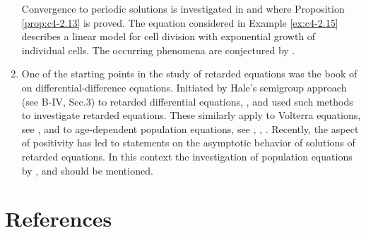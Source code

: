 \begin{enumerate}[label=\emph{Section \arabic*:}, wide, itemsep=1ex]
Convergence to periodic solutions is investigated in \citet{kerscherNagel:1984} and \citet{nagel:1984} where Proposition \ref{prop:c4-2.13} is proved.
The equation considered in Example \ref{ex:c4-2.15} describes a linear model for cell division with exponential growth of individual cells.
The occurring phenomena are conjectured by \citet{diekmannetal:1984}.

\item%
One of the starting points in the study of retarded equations was the book of \citet{bellmancooke:1963} on differential-difference equations.
Initiated by Hale's semigroup approach (see B-IV, Sec.3) to retarded differential equations, \citet{dysonvillella:1979}, \citet{villellabressan:1985} and \citet{webb:1977} used such methods to investigate retarded equations.
These similarly apply to Volterra equations, see \citet{miller:1974}, \citet{webb:1977} and to age-dependent population equations, see \citet{Pruess:1981}, \citet{webb:1984}, \citet{webb:1985a}.
Recently, the aspect of positivity has led to statements on the asymptotic behavior of solutions of retarded equations.
In this context the investigation of population equations by \citet{greiner:1984}, \citet{heijmans:1985a} and \citet{webb:1985b} should be mentioned.

\end{enumerate}

\section*{References}
{\RaggedRight
\renewcommand{\bibsection}{}

}

